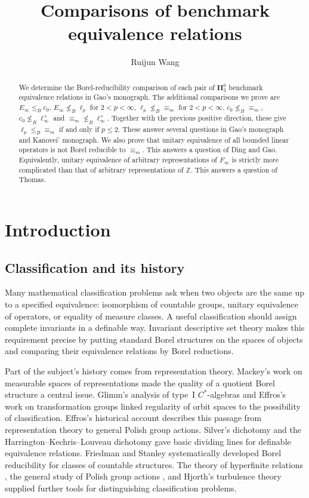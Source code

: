 \documentclass[11pt]{article}
\title{Comparisons of benchmark equivalence relations}
\author{Ruijun Wang}
\date{}
\numberwithin{equation}{section}
\theoremstyle{definition}
\begin{document}
\maketitle
\begin{abstract}
We determine the Borel-reducibility comparison of each pair of $\mathbf\Pi^0_3$ benchmark equivalence relations in Gao's monograph. The additional comparisons we prove are $E_\infty\leq_B c_0$, $E_\infty\nleq_B\ell_p$ for $2<p<\infty$, $\ell_p\nleq_B{\equiv_m}$ for $2<p<\infty$, $c_0\nleq_B{\equiv_m}$, $c_0\nleq_B\ell_\infty^+$ and $\equiv_m\nleq_B\ell_\infty^+$. Together with the previous positive direction, these give $\ell_p\leq_B{\equiv_m}$ if and only if $p\leq2$. These answer several questions in Gao's monograph and Kanovei' monograph. We also prove that unitary equivalence of all bounded linear operators is not Borel reducible to $\equiv_m$. This answers a question of Ding and Gao. Equivalently, unitary equivalence of arbitrary representations of $F_\infty$ is strictly more complicated than that of arbitrary representations of $\mathbb Z$. This answers a question of Thomas.
\end{abstract}

\section{Introduction}
\subsection{Classification and its history}
Many mathematical classification problems ask when two objects are the
same up to a specified equivalence: isomorphism of countable groups,
unitary equivalence of operators, or equality of measure classes.
A useful classification should assign complete invariants in a
definable way. Invariant descriptive set theory makes this requirement
precise by putting standard Borel structures on the spaces of objects
and comparing their equivalence relations by Borel reductions.

Part of the subject's history comes from representation theory.
Mackey's work on measurable spaces of representations made the quality
of a quotient Borel structure a central issue. Glimm's analysis of
type~I $C^*$-algebras and Effros's work on transformation groups linked
regularity of orbit spaces to the possibility of classification.
Effros's historical account \cite{Effros} describes this passage from
representation theory to general Polish group actions.
Silver's dichotomy \cite{Silver} and the
Harrington--Kechris--Louveau dichotomy \cite{HKL} gave basic dividing
lines for definable equivalence relations. Friedman and Stanley
\cite{FS} systematically developed Borel reducibility for classes of
countable structures. The theory of hyperfinite relations
\cite{DJK}, the general study of Polish group actions
\cite{BK}, and Hjorth's turbulence theory \cite{HjorthBook} supplied
further tools for distinguishing classification problems.
\end{document}
